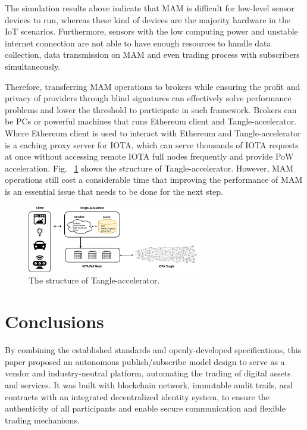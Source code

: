 \documentclass[conference]{IEEEtran}
\begin{document}
The simulation results above indicate that MAM is difficult for low-level sensor devices to run, whereas these kind of devices are the majority hardware in the IoT scenarios. Furthermore, sensors with the low computing power and unstable internet connection are not able to have enough resources to handle data collection, data transmission on MAM and even trading process with subscribers simultaneously. 

Therefore, transferring MAM operations to brokers while ensuring the profit and privacy of providers through blind signatures can effectively solve performance problems and lower the threshold to participate in such framework. Brokers can be PCs or powerful machines that runs Ethereum client and Tangle-accelerator\cite{TA}. Where Ethereum client is used to interact with Ethereum and Tangle-accelerator is a caching proxy server for IOTA, which can serve thousands of IOTA requests at once without accessing remote IOTA full nodes frequently and provide PoW acceleration. Fig.~ \ref{fig:ta_struct} shows the structure of Tangle-accelerator. However, MAM operations still cost a considerable time that improving the performance of MAM is an essential issue that needs to be done for the next step.  

\begin{figure}[!t]
    \centering
    \includegraphics[width=3in]{ta_structure}
    \caption{The structure of Tangle-accelerator.}
    \label{fig:ta_struct}
\end{figure}

\section{Conclusions}
By combining the established standards and openly-developed specifications, this paper proposed an autonomous publish/subscribe model design to serve as a vendor and industry-neutral platform, automating the trading of digital assets and services. It was built with blockchain network, immutable audit trails, and contracts with an integrated decentralized identity system, to ensure the authenticity of all participants and enable secure communication and flexible trading mechanisms.



\end{document}
